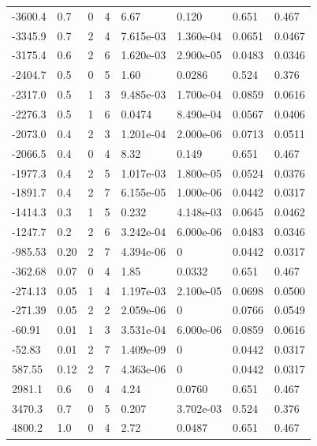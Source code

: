 \documentclass[preview]{standalone}
\begin{document}
{{\begin{tabular}{L{1.2cm}C{1.2cm} C{0.3cm}C{0.5cm} C{1.4cm}C{1.4cm} C{1.4cm}C{1.4cm}}
  -3600.4  &   0.7  & 0     &  4 &  6.67  & 0.120  & 0.651 &  0.467   \\ 
  -3345.9  &   0.7  & 2     &  4 &  7.615e-03  & 1.360e-04  & 0.0651 &  0.0467   \\ 
  -3175.4  &   0.6  & 2     &  6 &  1.620e-03  & 2.900e-05  & 0.0483 &  0.0346   \\ 
  -2404.7  &   0.5  & 0     &  5 &  1.60  & 0.0286  & 0.524 &  0.376   \\ 
  -2317.0  &   0.5  & 1     &  3 &  9.485e-03  & 1.700e-04  & 0.0859 &  0.0616   \\ 
  -2276.3  &   0.5  & 1     &  6 &  0.0474  & 8.490e-04  & 0.0567 &  0.0406   \\ 
  -2073.0  &   0.4  & 2     &  3 &  1.201e-04  & 2.000e-06  & 0.0713 &  0.0511   \\ 
  -2066.5  &   0.4  & 0     &  4 &  8.32  & 0.149  & 0.651 &  0.467   \\ 
  -1977.3  &   0.4  & 2     &  5 &  1.017e-03  & 1.800e-05  & 0.0524 &  0.0376   \\ 
  -1891.7  &   0.4  & 2     &  7 &  6.155e-05  & 1.000e-06  & 0.0442 &  0.0317   \\ 
  -1414.3  &   0.3  & 1     &  5 &  0.232  & 4.148e-03  & 0.0645 &  0.0462   \\ 
  -1247.7  &   0.2  & 2     &  6 &  3.242e-04  & 6.000e-06  & 0.0483 &  0.0346   \\ 
  -985.53  &  0.20  & 2     &  7 &  4.394e-06  & 0  & 0.0442 &  0.0317   \\ 
  -362.68  &  0.07  & 0     &  4 &  1.85  & 0.0332  & 0.651 &  0.467   \\ 
  -274.13  &  0.05  & 1     &  4 &  1.197e-03  & 2.100e-05  & 0.0698 &  0.0500   \\ 
  -271.39  &  0.05  & 2     &  2 &  2.059e-06  & 0  & 0.0766 &  0.0549   \\ 
  -60.91  &  0.01  & 1     &  3 &  3.531e-04  & 6.000e-06  & 0.0859 &  0.0616   \\ 
  -52.83  &  0.01  & 2     &  7 &  1.409e-09  & 0  & 0.0442 &  0.0317   \\ 
  587.55  &  0.12  & 2     &  7 &  4.363e-06  & 0  & 0.0442 &  0.0317   \\ 
  2981.1  &   0.6  & 0     &  4 &  4.24  & 0.0760  & 0.651 &  0.467   \\ 
  3470.3  &   0.7  & 0     &  5 &  0.207  & 3.702e-03  & 0.524 &  0.376   \\ 
  4800.2  &   1.0  & 0     &  4 &  2.72  & 0.0487  & 0.651 &  0.467   \\ 

\end{tabular}}}
\end{document}
